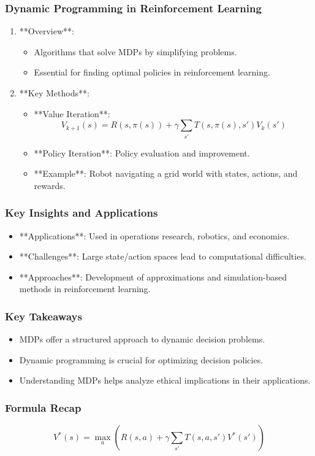 \documentclass{beamer}
\begin{document}
\begin{frame}[fragile]
    \frametitle{Dynamic Programming in Reinforcement Learning}
    \begin{enumerate}
        \item **Overview**:
        \begin{itemize}
            \item Algorithms that solve MDPs by simplifying problems.
            \item Essential for finding optimal policies in reinforcement learning.
        \end{itemize}
        \item **Key Methods**:
        \begin{itemize}
            \item **Value Iteration**:
            \begin{equation}
            V_{k+1}(s) = R(s, \pi(s)) + \gamma \sum_{s'} T(s, \pi(s), s') V_k(s')
            \end{equation}
            
            \item **Policy Iteration**: Policy evaluation and improvement.
            \item **Example**: Robot navigating a grid world with states, actions, and rewards.
        \end{itemize}
    \end{enumerate}
\end{frame}

\begin{frame}[fragile]
    \frametitle{Key Insights and Applications}
    \begin{itemize}
        \item **Applications**: Used in operations research, robotics, and economics.
        \item **Challenges**: Large state/action spaces lead to computational difficulties.
        \item **Approaches**: Development of approximations and simulation-based methods in reinforcement learning.
    \end{itemize}
\end{frame}

\begin{frame}[fragile]
    \frametitle{Key Takeaways}
    \begin{itemize}
        \item MDPs offer a structured approach to dynamic decision problems.
        \item Dynamic programming is crucial for optimizing decision policies.
        \item Understanding MDPs helps analyze ethical implications in their applications.
    \end{itemize}
\end{frame}

\begin{frame}[fragile]
    \frametitle{Formula Recap}
    \begin{equation}
    V^*(s) = \max_a \left(R(s, a) + \gamma \sum_{s'} T(s, a, s') V^*(s')\right)
    \end{equation}
\end{frame}
\end{document}
